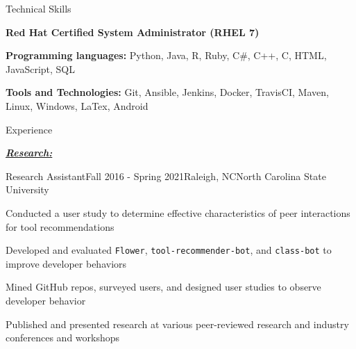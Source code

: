 \documentclass{resume} %
\begin{document}
\begin{rSection}{Technical Skills}
\vspace{-4pt}

\begin{sSubsection}
    {\small \textbf{Red Hat Certified System Administrator (RHEL 7)}}{}
\end{sSubsection}
\vspace{-9pt}

\begin{sSubsection}
    {\small \textbf{Programming languages:} Python, Java, R, Ruby, C\#, C++, C, HTML, JavaScript, SQL}{}
\end{sSubsection}
\vspace{-9pt}

\begin{sSubsection}
    {\small \textbf{Tools and Technologies:} Git, Ansible, Jenkins, Docker, TravisCI, Maven, Linux, Windows, LaTex, Android}{}
\end{sSubsection}
\vspace{-10pt}


\begin{rSection}{Experience}
\vspace{-4pt}

\underline{\textbf{\textit{Research:}}}
\vspace{-8pt}

\begin{pSubsection}{\small Research Assistant}{\small Fall 2016 - Spring 2021}{\small Raleigh, NC}{\small North Carolina State University}
\item {\small Conducted a user study to determine effective characteristics of peer interactions for tool recommendations}
\item {\small Developed and evaluated \texttt{Flower}, \texttt{tool-recommender-bot}, and \texttt{class-bot} to improve developer behaviors}
\item {\small Mined GitHub repos, surveyed users, and designed user studies to observe developer behavior}
\item {\small Published and presented research at various peer-reviewed research and industry conferences and workshops}


\end{pSubsection}
\end{rSection}
\end{rSection}
\end{document}
